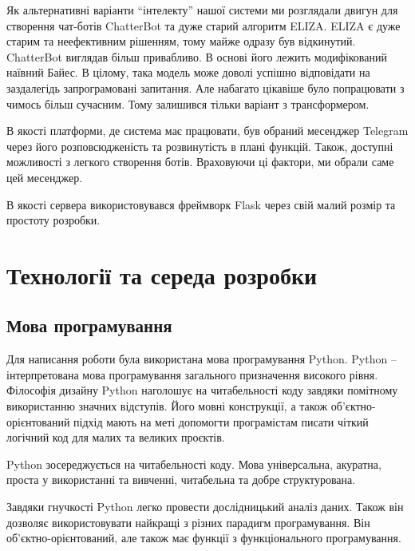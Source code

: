 \documentclass[a4paper,14pt]{extreport}
\begin{document}
    Як альтернативні варіанти ``інтелекту'' нашої системи ми розглядали двигун для створення чат-ботів ChatterBot та дуже старий алгоритм ELIZA. ELIZA є дуже старим та неефективним рішенням, тому майже одразу був відкинутий. ChatterBot виглядав більш привабливо. В основі його лежить модифікований наївний Байес. В цілому, така модель може доволі успішно відповідати на заздалегідь запрограмовані запитання. Але набагато цікавіше було попрацювати з чимось більш сучасним. Тому залишився тільки варіант з трансформером.

    В якості платформи, де система має працювати, був обраний месенджер Telegram через його розповсюдженість та розвинутість в плані функцій. Також, доступні можливості з легкого створення ботів. Враховуючи ці фактори, ми обрали саме цей месенджер.

    В якості сервера використовувався фреймворк Flask через свій малий розмір та простоту розробки.

\section{Технології та середа розробки}
    \subsection{Мова програмування}
        Для написання роботи була використана мова програмування Python. Python -- інтерпретована мова програмування загального призначення високого рівня. Філософія дизайну Python наголошує на читабельності коду завдяки помітному використанню значних відступів. Його мовні конструкції, а також об’єктно-орієнтований підхід мають на меті допомогти програмістам писати чіткий логічний код для малих та великих проєктів.

        Python зосереджується на читабельності коду. Мова універсальна, акуратна, проста у використанні та вивченні, читабельна та добре структурована.

        Завдяки гнучкості Python легко провести дослідницький аналіз даних. Також він дозволяє використовувати найкращі з різних парадигм програмування. Він об’єктно-орієнтований, але також має функції з функціонального програмування.
\end{document}
